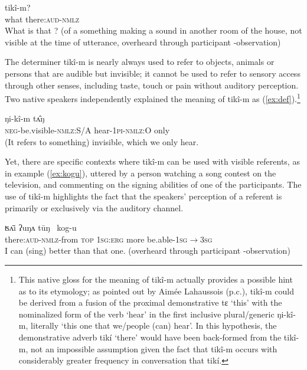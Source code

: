 \documentclass[oneside,a4paper,11pt]{article}
\newcommand{\ipa}[1]{{\phon \mbox{#1}}} %
\begin{document}
\begin{exe}
\ex \label{ex:what}
\gll  	\ipa{mâŋ}  	 	\ipa{tikî-m?}   \\
what  there:\textsc{aud}-\textsc{nmlz} \\
\glt What is that ? (of a something making a sound in another room of the house, not visible at the time of utterance, overheard through participant -observation)
\end{exe}

The determiner \ipa{tikî-m} is nearly always used to refer to objects, animals or persons  that are audible but invisible; it cannot be used to refer to sensory access through other senses, including taste, touch or pain without auditory perception. Two native speakers independently explained the meaning of  \ipa{tikî-m} as (\ref{ex:def}).\footnote{This native gloss for the meaning of \ipa{tikî-m} actually provides a possible hint as to its etymology; as pointed out by Aimée Lahaussois (p.c.), \ipa{tikî-m} could be derived from a fusion of the proximal demonstrative \ipa{tɛ} `this' with the nominalized form of the verb `hear' in the first inclusive plural/generic \ipa{ŋi-kî-m}, literally `this one that we/people (can) hear'. In this hypothesis, the demonstrative adverb \ipa{tikí} `there' would have been back-formed from the \ipa{tikî-m}, not an impossible assumption given the fact that  \ipa{tikî-m} occurs with considerably greater frequency in conversation that  \ipa{tikí}. }

\begin{exe}
\ex \label{ex:def}
\gll  	 	 \ipa{mu-toɔç-pɛ,} \ipa{ŋi-kî-m} \ipa{tʌ̂ŋ}   \\
\textsc{neg}-be.visible-\textsc{nmlz:S/A} hear-\textsc{1pi-nmlz:O} only  \\
\glt (It refers to something) invisible, which we only hear.
\end{exe}

Yet, there are specific contexts where \ipa{tikî-m}  can be used with visible referents, as in example  (\ref{ex:kogu}), uttered by a person watching a song contest on the television, and commenting on the signing abilities of one of the participants. The use of \ipa{tikî-m} highlights the  fact that the  speakers' perception of a referent is primarily or exclusively via the auditory channel.

\begin{exe}
\ex \label{ex:kogu}
\gll  	\ipa{tikî-m-kʌ}   	\ipa{ʦʌ̄i} \ipa{ʔuŋʌ} \ipa{tūŋ }   	\ipa{kog-u}   \\
there:\textsc{aud}-\textsc{nmlz}-from \textsc{top} \textsc{1sg:erg} more be.able-\textsc{1sg$\rightarrow$3sg}	  \\
\glt I can (sing) better than that one. (overheard through participant -observation)
\end{exe}
\end{document}
